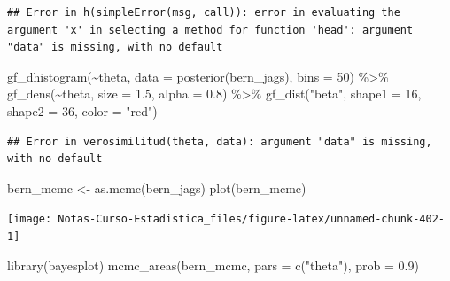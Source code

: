 \documentclass[
  12pt,
]{book}
\newenvironment{Shaded}{\begin{snugshade}}{\end{snugshade}}
\newcommand{\AttributeTok}[1]{\textcolor[rgb]{0.77,0.63,0.00}{#1}}
\newcommand{\DecValTok}[1]{\textcolor[rgb]{0.00,0.00,0.81}{#1}}
\newcommand{\FloatTok}[1]{\textcolor[rgb]{0.00,0.00,0.81}{#1}}
\newcommand{\FunctionTok}[1]{\textcolor[rgb]{0.00,0.00,0.00}{#1}}
\newcommand{\NormalTok}[1]{#1}
\newcommand{\OtherTok}[1]{\textcolor[rgb]{0.56,0.35,0.01}{#1}}
\newcommand{\SpecialCharTok}[1]{\textcolor[rgb]{0.00,0.00,0.00}{#1}}
\newcommand{\StringTok}[1]{\textcolor[rgb]{0.31,0.60,0.02}{#1}}
\theoremstyle{definition}
\theoremstyle{definition}
\theoremstyle{definition}
\theoremstyle{definition}
\theoremstyle{remark}
\begin{document}
\begin{verbatim}
## Error in h(simpleError(msg, call)): error in evaluating the argument 'x' in selecting a method for function 'head': argument "data" is missing, with no default
\end{verbatim}

\begin{Shaded}
\begin{Highlighting}[]
\FunctionTok{gf\_dhistogram}\NormalTok{(}\SpecialCharTok{\textasciitilde{}}\NormalTok{theta, }\AttributeTok{data =} \FunctionTok{posterior}\NormalTok{(bern\_jags),}
    \AttributeTok{bins =} \DecValTok{50}\NormalTok{) }\SpecialCharTok{\%\textgreater{}\%}
    \FunctionTok{gf\_dens}\NormalTok{(}\SpecialCharTok{\textasciitilde{}}\NormalTok{theta, }\AttributeTok{size =} \FloatTok{1.5}\NormalTok{, }\AttributeTok{alpha =} \FloatTok{0.8}\NormalTok{) }\SpecialCharTok{\%\textgreater{}\%}
    \FunctionTok{gf\_dist}\NormalTok{(}\StringTok{"beta"}\NormalTok{, }\AttributeTok{shape1 =} \DecValTok{16}\NormalTok{, }\AttributeTok{shape2 =} \DecValTok{36}\NormalTok{, }\AttributeTok{color =} \StringTok{"red"}\NormalTok{)}
\end{Highlighting}
\end{Shaded}

\begin{verbatim}
## Error in verosimilitud(theta, data): argument "data" is missing, with no default
\end{verbatim}

\begin{Shaded}
\begin{Highlighting}[]
\NormalTok{bern\_mcmc }\OtherTok{\textless{}{-}} \FunctionTok{as.mcmc}\NormalTok{(bern\_jags)}
\FunctionTok{plot}\NormalTok{(bern\_mcmc)}
\end{Highlighting}
\end{Shaded}

\begin{center}\texttt{[image: Notas-Curso-Estadistica\_files/figure-latex/unnamed-chunk-402-1]} \end{center}

\begin{Shaded}
\begin{Highlighting}[]
\FunctionTok{library}\NormalTok{(bayesplot)}
\FunctionTok{mcmc\_areas}\NormalTok{(bern\_mcmc, }\AttributeTok{pars =} \FunctionTok{c}\NormalTok{(}\StringTok{"theta"}\NormalTok{), }\AttributeTok{prob =} \FloatTok{0.9}\NormalTok{)}
\end{Highlighting}
\end{Shaded}
\end{document}
